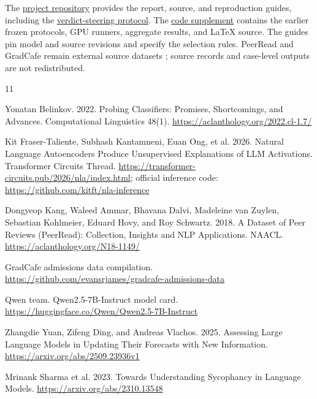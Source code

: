 \documentclass[10pt,letterpaper]{article}
\begin{document}

The \href{https://github.com/HowardHsuuu/llm-forecast-revision}{project repository} provides the report, source, and reproduction guides, including the \href{https://github.com/HowardHsuuu/llm-forecast-revision/blob/main/docs/reproduce-steering.md}{verdict-steering protocol}. The \href{https://github.com/HowardHsuuu/llm-forecast-revision/releases/download/v0.1.2/forecast-mechanisms-submission-code.zip}{code supplement} contains the earlier frozen protocols, GPU runners, aggregate results, and LaTeX source. The guides pin model and source revisions and specify the selection rules. PeerRead and GradCafe remain external source datasets \cite{ref3,ref4}; source records and case-level outputs are not redistributed.

\begin{thebibliography}{11}

\raggedright

\setlength{\itemsep}{3pt}

\raggedright Yonatan Belinkov. 2022. Probing Classifiers: Promises, Shortcomings, and Advances. Computational Linguistics 48(1). \url{https://aclanthology.org/2022.cl-1.7/}

\raggedright Kit Fraser-Taliente, Subhash Kantamneni, Euan Ong, et al. 2026. Natural Language Autoencoders Produce Unsupervised Explanations of LLM Activations. Transformer Circuits Thread. \url{https://transformer-circuits.pub/2026/nla/index.html}; official inference code: \url{https://github.com/kitft/nla-inference}

\raggedright Dongyeop Kang, Waleed Ammar, Bhavana Dalvi, Madeleine van Zuylen, Sebastian Kohlmeier, Eduard Hovy, and Roy Schwartz. 2018. A Dataset of Peer Reviews (PeerRead): Collection, Insights and NLP Applications. NAACL. \url{https://aclanthology.org/N18-1149/}

\raggedright GradCafe admissions data compilation. \url{https://github.com/evansrjames/gradcafe-admissions-data}

\raggedright Qwen team. Qwen2.5-7B-Instruct model card. \url{https://huggingface.co/Qwen/Qwen2.5-7B-Instruct}

\raggedright Zhangdie Yuan, Zifeng Ding, and Andreas Vlachos. 2025. Assessing Large Language Models in Updating Their Forecasts with New Information. \url{https://arxiv.org/abs/2509.23936v1}

\raggedright Mrinank Sharma et al. 2023. Towards Understanding Sycophancy in Language Models. \url{https://arxiv.org/abs/2310.13548}


\end{thebibliography}
\end{document}
